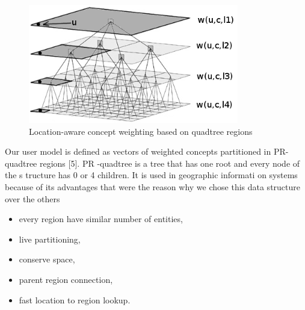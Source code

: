 \documentclass[conference]{IEEEtran}
\begin{document}
\begin{figure}[h]
\centering 
\includegraphics{obr1}
\caption{ Location-aware concept weighting based on quadtree
 regions}
\end{figure}

Our   user   model   is   defined   as   vectors   of   weighted 
concepts partitioned in PR-quadtree regions [5]. PR
-quadtree 
is a tree that has one root and every node of the s
tructure has 
0 or 4 children. It is used in geographic informati
on systems 
because of its advantages that were the reason why 
we chose 
this data structure over the others

\begin{itemize}
\item{every region have similar number of entities,}
\item{live partitioning,}
\item{conserve space,}
\item{parent region connection,}
\item{fast location to region lookup.}
\end{itemize}
\end{document}
